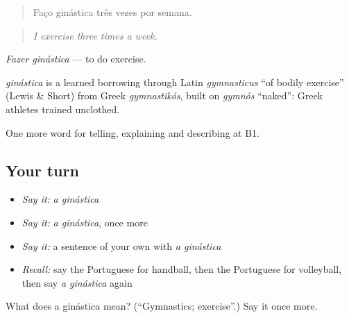 \begin{quote}
Faço ginástica três vezes por semana.
\end{quote}

\begin{quote}
\emph{I exercise three times a week.}
\end{quote}

\emph{Fazer ginástica} — to do exercise.

\begin{cousinweb}
\emph{ginástica} is a learned borrowing through Latin \emph{gymnasticus} \textquotedblleft{}of bodily exercise\textquotedblright{} (Lewis \& Short) from Greek \emph{gymnastikós}, built on \emph{gymnós} \textquotedblleft{}naked\textquotedblright{}: Greek athletes trained unclothed.
\end{cousinweb}

\begin{grammarlens}[title={What you've built}]
One more word for telling, explaining and describing at B1.
\end{grammarlens}

\subsection*{Your turn}
\begin{itemize}
\raggedright
  \item \emph{Say it:} \emph{a ginástica}
  \item \emph{Say it:} \emph{a ginástica}, once more
  \item \emph{Say it:} a sentence of your own with \emph{a ginástica}
  \item \emph{Recall:} say the Portuguese for handball, then the Portuguese for volleyball, then say \emph{a ginástica} again
\end{itemize}

\begin{tcolorbox}[breakable,colback=teal!4,colframe=teal!35!black,title={Before you move on}]
What does a ginástica mean? (\textquotedblleft{}Gymnastics; exercise\textquotedblright{}.) Say it once more.
\end{tcolorbox}

